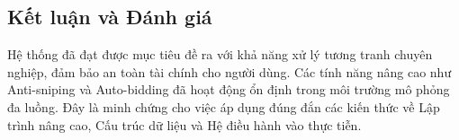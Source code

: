 \documentclass[12pt,a4paper]{article}
\begin{document}
\subsection{Kết luận và Đánh giá}
Hệ thống đã đạt được mục tiêu đề ra với khả năng xử lý tương tranh chuyên nghiệp, đảm bảo an toàn tài chính cho người dùng. Các tính năng nâng cao như Anti-sniping và Auto-bidding đã hoạt động ổn định trong môi trường mô phỏng đa luồng. Đây là minh chứng cho việc áp dụng đúng đắn các kiến thức về Lập trình nâng cao, Cấu trúc dữ liệu và Hệ điều hành vào thực tiễn.
\end{document}
